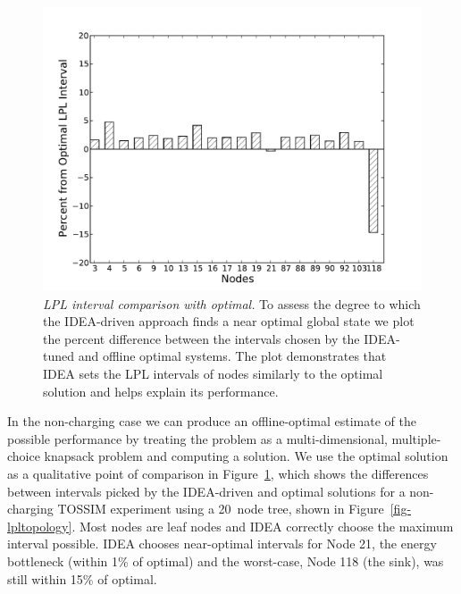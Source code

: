 \begin{figure}[t]
\begin{center}
\includegraphics[width=\hsize]{./figs/graph_lpl_interval_comparison.pdf}
\end{center}

\caption{\textit{LPL interval comparison with optimal.} To assess the degree
to which the IDEA-driven approach finds a near optimal global state we plot
the percent difference between the intervals chosen by the IDEA-tuned and
offline optimal systems. The plot demonstrates that IDEA sets the LPL
intervals of nodes similarly to the optimal solution and helps explain its
performance.}

\label{fig-intervalvoptimal}
\end{figure}

In the non-charging case we can produce an offline-optimal estimate of the
possible performance by treating the problem as a multi-dimensional,
multiple-choice knapsack problem and computing a solution. We use the optimal
solution as a qualitative point of comparison in
Figure~\ref{fig-intervalvoptimal}, which shows the differences between
intervals picked by the IDEA-driven and optimal solutions for a non-charging
TOSSIM experiment using a 20~node tree, shown in
Figure~\ref{fig-lpltopology}. Most nodes are leaf nodes and IDEA correctly
choose the maximum interval possible. IDEA chooses near-optimal intervals for
Node 21, the energy bottleneck (within 1\% of optimal) and the worst-case,
Node 118 (the sink), was still within 15\% of optimal.

